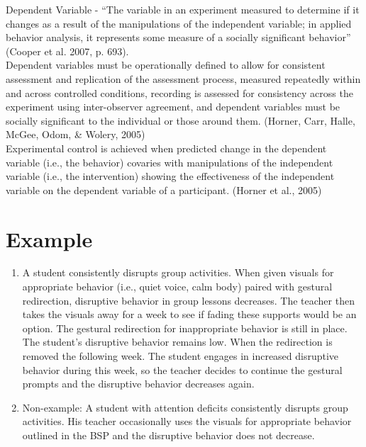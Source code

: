 Dependent Variable - ``The variable in an experiment measured to determine if it changes as a result of the manipulations of the independent variable; in applied behavior analysis, it represents some measure of a socially significant behavior'' (Cooper et al. 2007, p. 693).\\

Dependent variables must be operationally defined to allow for consistent assessment and replication of the assessment process, measured repeatedly within and across controlled conditions, recording is assessed for consistency across the experiment using inter-observer agreement, and dependent variables must be socially significant to the individual or those around them. (Horner, Carr, Halle, McGee, Odom, \& Wolery, 2005)\\

Experimental control is achieved when predicted change in the dependent variable (i.e., the behavior) covaries with manipulations of the independent variable (i.e., the intervention) showing the effectiveness of the independent variable on the dependent variable of a participant. (Horner et al., 2005)
%
\section{Example} 
\begin{enumerate}
\item   A student consistently disrupts group activities. When given visuals for appropriate behavior (i.e., quiet voice, calm body) paired with gestural redirection, disruptive behavior in group lessons decreases. The teacher then takes the visuals away for a week to see if fading these supports would be an option. The gestural redirection for inappropriate behavior is still in place. The student's disruptive behavior remains low. When the redirection is removed the following week. The student engages in increased disruptive behavior during this week, so the teacher decides to continue the gestural prompts and the disruptive behavior decreases again. 
\item Non-example: A student with attention deficits consistently disrupts group activities. His teacher occasionally uses the visuals for appropriate behavior outlined in the BSP and the disruptive behavior does not decrease.
\end{enumerate}

